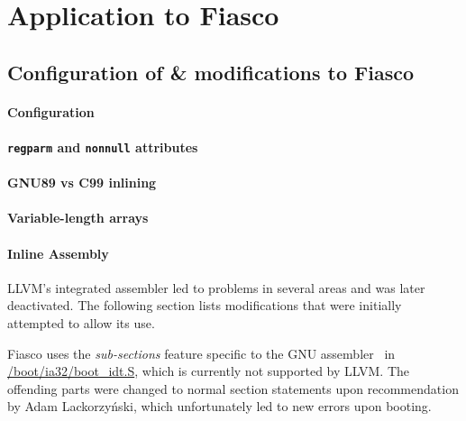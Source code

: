 \section{Application to Fiasco}

\subsection{Configuration of \& modifications to Fiasco}

\paragraph{Configuration}



\paragraph{\texttt{regparm} and \texttt{nonnull} attributes}



\paragraph{GNU89 vs C99 inlining}


\paragraph{Variable-length arrays}


\paragraph{Inline Assembly}

LLVM's integrated assembler led to problems in several areas and was later
deactivated. The following section lists modifications that were initially
attempted to allow its use.

Fiasco uses the \emph{sub-sections} feature specific to the GNU
assembler~\cite{gas-subsections} in \url{/boot/ia32/boot\_idt.S}, which is
currently not supported by LLVM. The offending parts were changed to normal
section statements upon recommendation by Adam
Lackorzyński, which unfortunately led to new errors upon booting.

